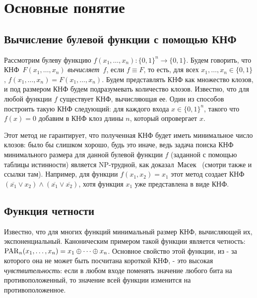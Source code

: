 \section{Основные понятие}

\subsection{Вычисление булевой функции с помощью КНФ}
Рассмотрим булеву функцию $f(x_1, \dotsc, x_n) \colon \{0,1\}^n \to \{0,1\}$. 
Будем говорить, что КНФ~$F(x_1, \dotsc, x_n)$ \emph{вычисляет~$f$}, если $f \equiv F$, то есть, для всех $x_1, \dotsc, x_n \in \{0,1\}$, $f(x_1, \dotsc, x_n)=F(x_1, \dotsc, x_n)$. 
Будем представлять КНФ как множество клозов, и под размером КНФ будем подразумевать количество клозов. Известно, что для любой функции $f$ существует КНФ, вычисляющая ее. 
Один из способов построить такую КНФ следующий: для каждого входа $x \in \{0,1\}^n$, такого что $f(x) = 0$ добавим в КНФ клоз длины $n$, который опровергает $x$.

Этот метод не гарантирует, что полученная КНФ будет иметь минимальное число клозов:
было бы слишком хорошо, будь это иначе, 
ведь задача поиска КНФ минимального размера для данной булевой функции $f$ (заданной с помощью таблицы истинности) является NP-трудной, как доказал~Масек~\cite{MasekNpComp} 
(смотри также \cite{DBLP:journals/siamcomp/AllenderHMPS08} и ссылки там).
Например, для функции  $f(x_1,x_2)=x_1$ этот метод
создает КНФ $(\overline{x_1} \lor x_2) \land (\overline{x_1} \lor \overline{x_2})$, хотя функция $x_1$ уже представлена в виде КНФ.

\subsection{Функция четности}
Известно, что для многих функций минимальный размер КНФ, вычисляющей их, экспоненциальный. 
Каноническим примером такой функции является четность: $\operatorname{PAR}_n(x_1, \dotsc, x_n)=x_1 \oplus \dotsb \oplus x_n$. 
Основное свойство этой функции, из - за которого она не может быть посчитана короткой КНФ, - это высокая \emph{чувствительность}:
если в любом входе поменять значение любого бита на противоположенный,
то значение всей функции изменится на противоположенное.

